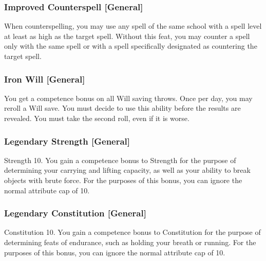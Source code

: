 \subsubsection{Improved Counterspell [General]}
 When counterspelling, you may use any spell of the same school with a spell level at least as high as the target spell.
 Without this feat, you may counter a spell only with the same spell or with a spell specifically designated as countering the target spell.

\subsubsection{Iron Will [General]}
 You get a  competence bonus on all Will saving throws. Once per day, you may reroll a Will save. You must decide to use this ability before the results are revealed. You must take the second roll, even if it is worse.

\subsubsection{Legendary Strength [General]}
\featpre Strength 10.
\featben You gain a  competence bonus to Strength for the purpose of determining your carrying and lifting capacity, as well as your ability to break objects with brute force. For the purposes of this bonus, you can ignore the normal attribute cap of 10.


\subsubsection{Legendary Constitution [General]}
\featpre Constitution 10.
\featben You gain a  competence bonus to Constitution for the purpose of determining feats of endurance, such as holding your breath or running. For the purposes of this bonus, you can ignore the normal attribute cap of 10.


